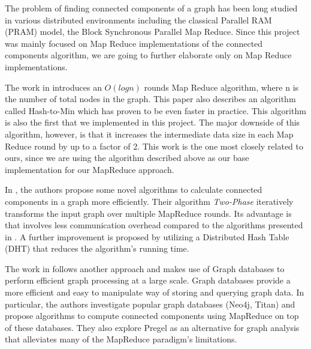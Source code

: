 The problem of finding connected components of a graph has been long studied in various distributed environments including the classical Parallel RAM (PRAM) model, the Block Synchronous Parallel Map Reduce. Since this project was mainly focused on Map Reduce implementations of the connected components algorithm, we are going to further elaborate only on Map Reduce implementations.

The work in \cite{rastogi} introduces an $O(logn)$ rounds Map Reduce algorithm, where n is the number of total nodes in the graph. This paper also describes an algorithm called Hash-to-Min which has proven to be even faster in practice. This algorithm is also the first that we implemented in this project. The major downside of this algorithm, however, is that it increases the intermediate data size in each Map Reduce round by up to a factor of 2. This work is the one most closely related to ours, since we are using the algorithm described above as our base implementation for our MapReduce approach.

In \cite{kiveris}, the authors propose some novel algorithms to calculate connected components in a graph more efficiently. Their algorithm \textit{Two-Phase} iteratively transforms the input graph over multiple MapReduce rounds. Its advantage is that involves less communication overhead compared to the algorithms presented in \cite{rastogi}. A further improvement is proposed by utilizing a Distributed Hash Table (\ie DHT) that reduces the algorithm's running time. 

The work in \cite{lim2015} follows another approach and makes use of Graph databases to perform efficient graph processing at a large scale. Graph databases provide a more efficient and easy to manipulate way of storing and querying graph data. In particular, the authors investigate popular graph databases (Neo4j, Titan) and propose algorithms to compute connected components using MapReduce on top of these databases. They also explore Pregel \cite{pregel} as an alternative for graph analysis that alleviates many of the MapReduce paradigm's limitations.